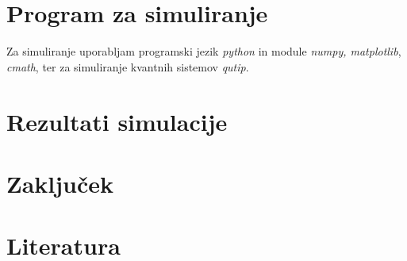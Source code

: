 \documentclass[12pt, a4paper]{article}
\begin{document}
\section{Program za simuliranje}
Za simuliranje uporabljam programski jezik \textit{python} in module \textit{numpy, matplotlib}, \textit{cmath}, ter za simuliranje kvantnih sistemov \textit{qutip}.

\section{Rezultati simulacije}

\section{Zaključek}

\section{Literatura}
\end{document}
